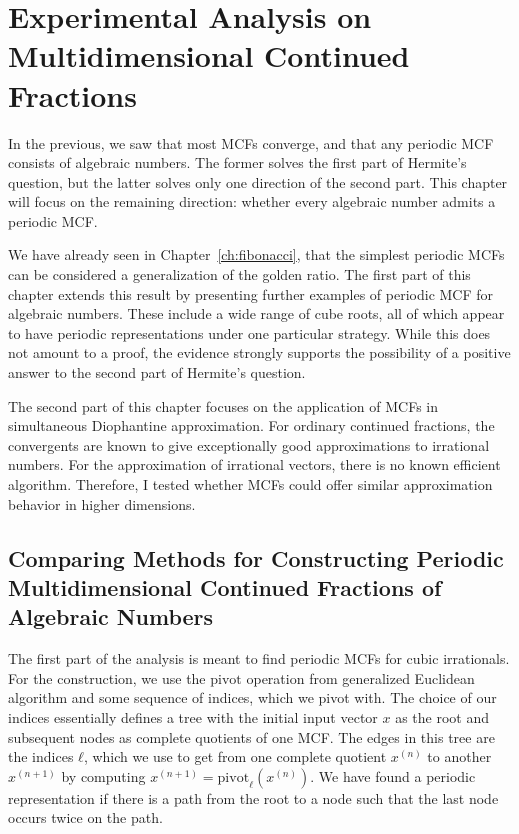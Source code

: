\chapter{Experimental Analysis on Multidimensional Continued Fractions}
\label{ch:implementation}

In the previous, we saw that most MCFs converge,
and that any periodic MCF consists of algebraic numbers.
The former solves the first part of Hermite's question, but the latter solves
only one direction of the second part.
This chapter will focus on the remaining direction:
whether every algebraic number admits a periodic MCF.

We have already seen in Chapter~\ref{ch:fibonacci},
that the simplest periodic MCFs can be considered a generalization of the
golden ratio.
The first part of this chapter extends this result by presenting further
examples of periodic MCF for algebraic numbers.
These include a wide range of cube roots,
all of which appear to have periodic representations under one particular strategy.
While this does not amount to a proof, the evidence strongly supports
the possibility of a positive answer to the second part of Hermite’s question.

The second part of this chapter focuses on the application of MCFs in simultaneous Diophantine approximation.
For ordinary continued fractions, the convergents are known to give
exceptionally good approximations to irrational numbers.
For the approximation of irrational vectors, there is no known efficient algorithm.
Therefore, I tested whether MCFs could offer similar approximation behavior in higher dimensions.

\section{Comparing Methods for Constructing Periodic Multidimensional Continued Fractions of Algebraic Numbers}
\label{sec:comparison}

The first part of the analysis is meant to find periodic MCFs for cubic
irrationals.
For the construction, we use the $\mathrm{pivot}$ operation from generalized
Euclidean algorithm and some sequence of indices, which we pivot with.
The choice of our indices essentially defines a tree
with the initial input vector $x$ as the root
and subsequent nodes as complete quotients of one MCF.
The edges in this tree are the indices $ℓ$, which we use to get from one
complete quotient $x^{(n)}$ to another $x^{(n+1)}$ by computing $x^{(n+1)} =
\mathrm{pivot}_ℓ(x^{(n)})$.
We have found a periodic representation if there is a path from the root to a
node such that the last node occurs twice on the path.

